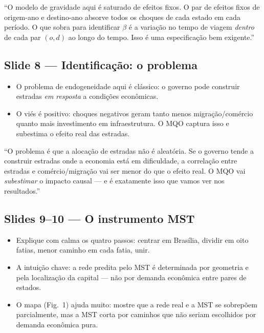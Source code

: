 \documentclass[12pt, a4paper]{article}
\begin{document}
\vspace{2cm}

\begin{mdframed}[style=sintese]
``O modelo de gravidade aqui é saturado de efeitos fixos. O par de efeitos fixos de origem-ano e destino-ano
absorve todos os choques de cada estado em cada período. O que sobra para identificar $\beta$ é a variação
no tempo de viagem \textit{dentro} de cada par $(o,d)$ ao longo do tempo. Isso é uma especificação bem exigente.''
\end{mdframed}

\subsection*{Slide 8 --- Identificação: o problema}

\begin{itemize}
    \item O problema de endogeneidade aqui é clássico: o governo pode construir estradas \textit{em resposta} a condições econômicas.
    \item O viés é positivo: choques negativos geram tanto menos migração/comércio quanto mais investimento em infraestrutura. O MQO captura isso e subestima o efeito real das estradas.
\end{itemize}

\begin{mdframed}[style=sintese]
``O problema é que a alocação de estradas não é aleatória. Se o governo tende a construir estradas
onde a economia está em dificuldade, a correlação entre estradas e comércio/migração vai ser menor
do que o efeito real. O MQO vai \textit{subestimar} o impacto causal --- e é exatamente isso que vamos ver nos resultados.''
\end{mdframed}

\subsection*{Slides 9--10 --- O instrumento MST}

\begin{itemize}
    \item Explique com calma os quatro passos: centrar em Brasília, dividir em oito fatias, menor caminho em cada fatia, unir.
    \item A intuição chave: a rede predita pelo MST é determinada por geometria e pela localização da capital --- não por demanda econômica entre pares de estados.
    \item O mapa (Fig.\ 1) ajuda muito: mostre que a rede real e a MST se sobrepõem parcialmente, mas a MST corta por caminhos que não seriam escolhidos por demanda econômica pura.
\end{itemize}
\end{document}
